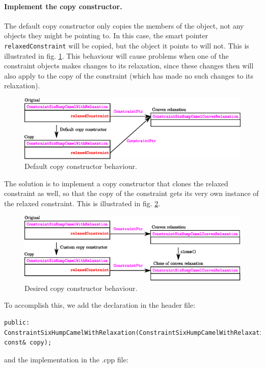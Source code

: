 \paragraph{Implement the copy constructor.} The default copy constructor only copies the members of the object, not any objects they might be pointing to. In this case, the smart pointer \texttt{relaxedConstraint} will be copied, but the  object it points to will not. This is illustrated in fig. \ref{fig:nodeepcopy}. This behaviour will cause problems when one of the constraint objects makes changes to its relaxation, since these changes then will also apply to the copy of the constraint (which has made no such changes to its relaxation).
\begin{figure}[H]
\centering
\includegraphics[scale=0.7]{figures/nodeepcopy.eps}
\caption{Default copy constructor behaviour.}
\label{fig:nodeepcopy}
\end{figure}
The solution is to implement a copy constructor that clones the relaxed constraint as well, so that the copy of the constraint gets its very own instance of the relaxed constraint. This is illustrated in fig. \ref{fig:deepcopy}.
\begin{figure}[H]
\centering
\includegraphics[scale=0.7]{figures/deepcopy.eps}
\caption{Desired copy constructor behaviour.}
\label{fig:deepcopy}
\end{figure}
To accomplish this, we add the declaration in the header file:
\begin{lstlisting}
public:							ConstraintSixHumpCamelWithRelaxation(ConstraintSixHumpCamelWithRelaxation const& copy);
\end{lstlisting}
and the implementation in the .cpp file:
